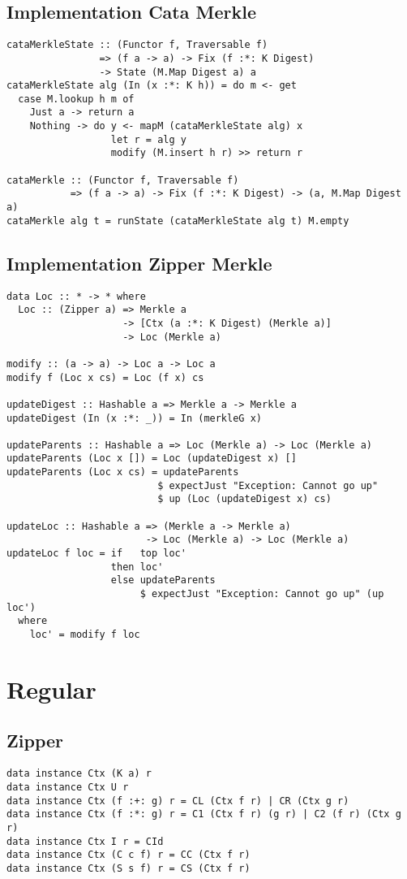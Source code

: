 \subsection{Implementation Cata Merkle}
\label{app-impl-cata-merkle}
\begin{verbatim}
cataMerkleState :: (Functor f, Traversable f)
                => (f a -> a) -> Fix (f :*: K Digest) 
                -> State (M.Map Digest a) a
cataMerkleState alg (In (x :*: K h)) = do m <- get
  case M.lookup h m of
    Just a -> return a
    Nothing -> do y <- mapM (cataMerkleState alg) x
                  let r = alg y
                  modify (M.insert h r) >> return r

cataMerkle :: (Functor f, Traversable f)
           => (f a -> a) -> Fix (f :*: K Digest) -> (a, M.Map Digest a)
cataMerkle alg t = runState (cataMerkleState alg t) M.empty
\end{verbatim}

\subsection{Implementation Zipper Merkle}
\label{app-impl-zipper-merkle}
\begin{verbatim}
data Loc :: * -> * where
  Loc :: (Zipper a) => Merkle a 
                    -> [Ctx (a :*: K Digest) (Merkle a)] 
                    -> Loc (Merkle a)

modify :: (a -> a) -> Loc a -> Loc a
modify f (Loc x cs) = Loc (f x) cs

updateDigest :: Hashable a => Merkle a -> Merkle a
updateDigest (In (x :*: _)) = In (merkleG x)

updateParents :: Hashable a => Loc (Merkle a) -> Loc (Merkle a)
updateParents (Loc x []) = Loc (updateDigest x) []
updateParents (Loc x cs) = updateParents
                          $ expectJust "Exception: Cannot go up"
                          $ up (Loc (updateDigest x) cs)

updateLoc :: Hashable a => (Merkle a -> Merkle a) 
                        -> Loc (Merkle a) -> Loc (Merkle a)
updateLoc f loc = if   top loc'
                  then loc'
                  else updateParents 
                       $ expectJust "Exception: Cannot go up" (up loc')
  where
    loc' = modify f loc
\end{verbatim}

\section{Regular}

\subsection{Zipper}
\begin{verbatim}
data instance Ctx (K a) r
data instance Ctx U r
data instance Ctx (f :+: g) r = CL (Ctx f r) | CR (Ctx g r)
data instance Ctx (f :*: g) r = C1 (Ctx f r) (g r) | C2 (f r) (Ctx g r)
data instance Ctx I r = CId
data instance Ctx (C c f) r = CC (Ctx f r)
data instance Ctx (S s f) r = CS (Ctx f r)
\end{verbatim}
